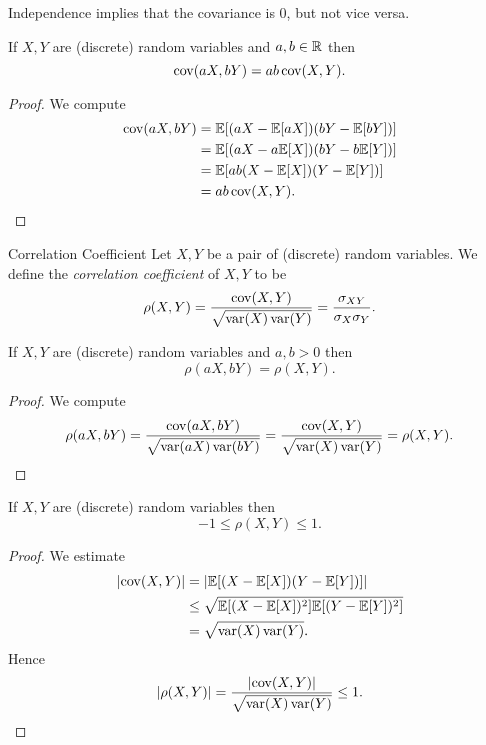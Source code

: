 \documentclass[class=article, crop=false]{standalone}
\begin{document}
  \begin{note}{}
    Independence implies that the covariance is 0, but not vice versa.
  \end{note}
  \begin{theorem}{}
    If $X, Y$ are (discrete) random variables and $a, b\in\mathbb{R}$ then
    \[
      \operatorname{cov}(aX, bY) = ab\operatorname{cov}(X, Y).
    \]
    \begin{proof}
      We compute
      \begin{align*}
        \operatorname{cov}(aX, bY) &= \mathbb{E}[(aX - \mathbb{E}[aX])(bY - \mathbb{E}[bY])] \\
                     &= \mathbb{E}[(aX - a\mathbb{E}[X])(bY - b\mathbb{E}[Y])] \\
                     &= \mathbb{E}[ab(X - \mathbb{E}[X])(Y - \mathbb{E}[Y])] \\
                     &= ab\operatorname{cov}(X, Y).
      \end{align*}
    \end{proof}
  \end{theorem}
  \begin{definition}{Correlation Coefficient}
    Let $X, Y$ be a pair of (discrete) random variables. We define the \emph{correlation coefficient} of $X, Y$ to be
    \[
      \rho(X, Y) = \frac{\operatorname{cov}(X, Y)}{\sqrt{\operatorname{var}(X)\operatorname{var}(Y)}} = \frac{\sigma_{XY}}{\sigma_X\sigma_Y}.
    \]
  \end{definition}
  \begin{theorem}{}
    If $X, Y$ are (discrete) random variables and $a, b > 0$ then
    \[
      \rho(aX, bY) = \rho(X, Y).
    \]
    \begin{proof}
      We compute
      \[
        \rho(aX, bY) = \frac{\operatorname{cov}(aX, bY)}{\sqrt{\operatorname{var}(aX)\operatorname{var}(bY)}} = \frac{\operatorname{cov}(X, Y)}{\sqrt{\operatorname{var}(X)\operatorname{var}(Y)}} = \rho(X, Y).
      \]
    \end{proof}
  \end{theorem}
  \begin{theorem}{}
    If $X, Y$ are (discrete) random variables then
    \[
      -1 \leq \rho(X, Y) \leq 1.
    \]
    \begin{proof}
      We estimate
      \begin{align*}
        \left\lvert \operatorname{cov}(X, Y) \right\rvert &= \left\lvert \mathbb{E}[(X - \mathbb{E}[X])(Y - \mathbb{E}[Y])] \right\rvert \\
                         &\leq \sqrt{\mathbb{E}[(X - \mathbb{E}[X])^2]\mathbb{E}[(Y - \mathbb{E}[Y])^2]} \\
                         &= \sqrt{\operatorname{var}(X)\operatorname{var}(Y)}.
      \end{align*}
      Hence
      \[
        \left\lvert \rho(X, Y) \right\rvert = \frac{\left\lvert \operatorname{cov}(X, Y) \right\rvert}{\sqrt{\operatorname{var}(X)\operatorname{var}(Y)}} \leq 1.
      \]
    \end{proof}
  \end{theorem}
\end{document}
